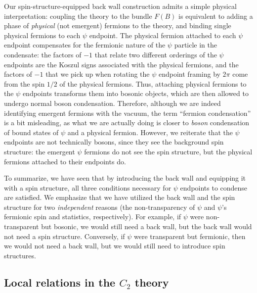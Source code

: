 \documentclass[12pt,a4paper]{article}
\begin{document}
\medskip

Our spin-structure-equipped back wall construction admits a simple physical interpretation: coupling the 
theory to the bundle $F(B)$ is equivalent to adding a phase of {\it physical} (not emergent) fermions to the theory, 
and binding single physical fermions to each $\psi$ endpoint.
The physical fermion attached to each $\psi$ endpoint compensates for the fermionic nature of the $\psi$ particle 
in the condensate: the factors of $-1$ that relate two different orderings of the $\psi$ endpoints are the Koszul 
signs associated with the physical fermions, and the factors of $-1$ that we pick up when rotating the $\psi$ 
endpoint framing by $2\pi$ come from the spin $1/2$ of the physical fermions. 
Thus, attaching physical fermions to the $\psi$ endpoints transforms them into bosonic objects, which are then 
allowed to undergo normal boson condensation. 
Therefore, although we are indeed identifying emergent fermions with the vacuum, the term ``fermion condensation'' 
is a bit misleading, as what we are actually doing is closer to {\it boson} condensation of bound states of $\psi$ 
and a physical fermion. 
However, we reiterate that the $\psi$ endpoints are not technically bosons, since they see the background spin structure: 
the emergent $\psi$ fermions do not see the spin structure, but the physical fermions attached to their endpoints do. 

\medskip

To summarize, we have seen that by introducing the back wall and equipping it with a spin structure, all three 
conditions necessary for $\psi$ endpoints to condense are satisfied.
We emphasize that we have utilized the back wall and the spin structure for two {\it independent} reasons 
(the non-transparency of $\psi$ and $\psi$'s fermionic spin and statistics, respectively). 
For example, if $\psi$ were non-transparent but bosonic, we would still need a back wall, but the back wall 
would not need a spin structure.
Conversely, if $\psi$ were transparent but fermionic, then we would not need a back wall, but we would still 
need to introduce spin
structures.


 
 
\subsection{Local relations in the $C_2$ theory} \label{C2_local_relns}
\end{document}
